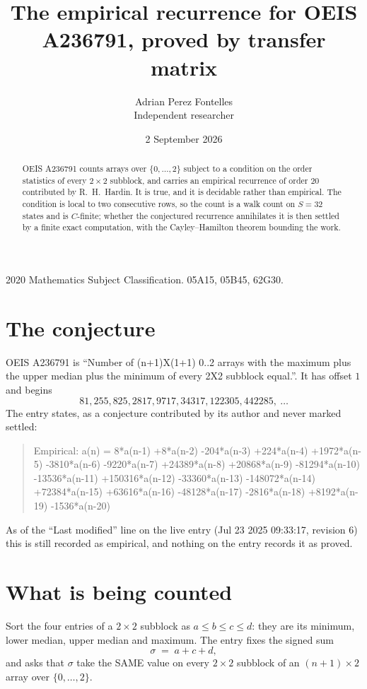 \documentclass[11pt,a4paper]{article}
\title{The empirical recurrence for OEIS A236791, proved by transfer matrix}
\author{Adrian Perez Fontelles\\ \small Independent researcher}
\date{2 September 2026}
\theoremstyle{plain}
\theoremstyle{definition}
\begin{document}
\maketitle

\begin{abstract}
OEIS A236791 counts arrays over $\{0,\dots,2\}$ subject to a condition on the order
statistics of every $2\times2$ subblock, and carries an empirical recurrence of order
$20$ contributed by R.~H.~Hardin. It is true, and it is decidable rather than empirical.
The condition is local to two consecutive rows, so the count is a walk count on $S=32$
states and is $C$-finite; whether the conjectured recurrence annihilates it is then settled by
a finite exact computation, with the Cayley--Hamilton theorem bounding the work.
\end{abstract}

\noindent\small 2020 Mathematics Subject Classification. 05A15, 05B45, 62G30.\normalsize

\section{The conjecture}

OEIS A236791 is ``Number of (n+1)X(1+1) 0..2 arrays with the maximum plus the upper median plus the minimum of every 2X2 subblock equal.''. It has offset $1$ and begins
\[
81, 255, 825, 2817, 9717, 34317, 122305, 442285,\ \dots
\]
The entry states, as a conjecture contributed by its author and never marked settled:
\begin{quote}
Empirical: a(n) = 8*a(n-1) +8*a(n-2) -204*a(n-3) +224*a(n-4) +1972*a(n-5) -3810*a(n-6) -9220*a(n-7) +24389*a(n-8) +20868*a(n-9) -81294*a(n-10) -13536*a(n-11) +150316*a(n-12) -33360*a(n-13) -148072*a(n-14) +72384*a(n-15) +63616*a(n-16) -48128*a(n-17) -2816*a(n-18) +8192*a(n-19) -1536*a(n-20)
\end{quote}
As of the ``Last modified'' line on the live entry (Jul 23 2025 09:33:17, revision 6) this is still
recorded as empirical, and nothing on the entry records it as proved.

\section{What is being counted}

Sort the four entries of a $2\times2$ subblock as $a\le b\le c\le d$: they
are its minimum, lower median, upper median and maximum. The entry fixes the signed sum
\[
\sigma\;=\;a+c+d,
\]
and asks that $\sigma$ take the SAME value on every $2\times2$ subblock of an
$(n+1)\times2$ array over $\{0,\dots,2\}$.
\end{document}
